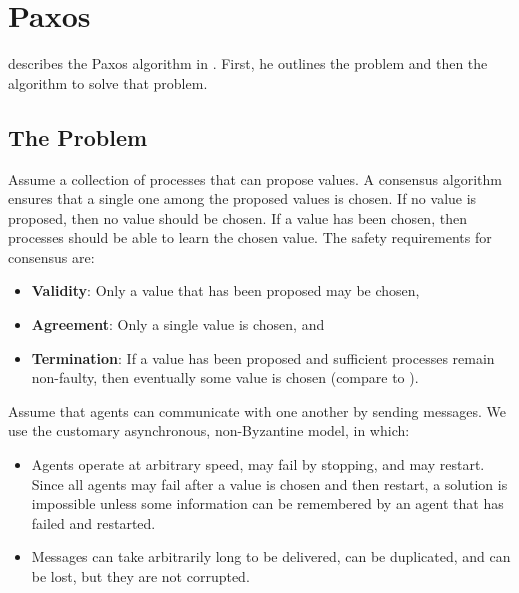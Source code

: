 \section{Paxos}
\citeauthor{Lamport01} describes the Paxos algorithm in \cite{Lamport01}.
First, he outlines the problem and then the algorithm to solve that problem.

\subsection{The Problem}
Assume a collection of processes that can propose values.
A consensus algorithm ensures that a single one among the proposed values is chosen.
If no value is proposed, then no value should be chosen.
If a value has been chosen, then processes should be able to learn the chosen value.
The safety requirements for consensus are:

\begin{itemize}
    \item \textbf{Validity}: Only a value that has been proposed may be chosen,
    \item \textbf{Agreement}: Only a single value is chosen, and
    \item \textbf{Termination}: If a value has been proposed and sufficient processes remain non-faulty, then eventually some value is chosen (compare to \cite{Lamport05}).
\end{itemize}

Assume that agents can communicate with one another by sending messages.
We use the customary asynchronous, non-Byzantine model, in which:

\begin{itemize}
    \item Agents operate at arbitrary speed, may fail by stopping, and may restart.
    Since all agents may fail after a value is chosen and then restart, a solution is impossible unless some information can be remembered by an agent that has failed and restarted.
    \item Messages can take arbitrarily long to be delivered, can be duplicated, and can be lost, but they are not corrupted.
\end{itemize}

